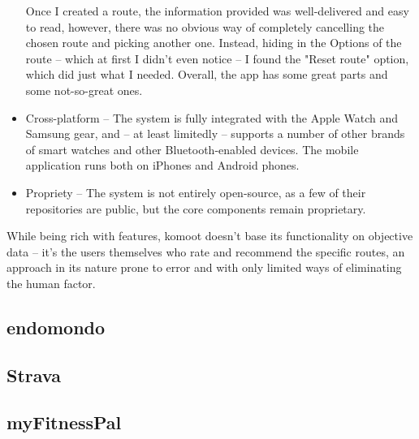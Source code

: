 \begin{itemize}
    Once I created a route, the information provided was well-delivered and easy to read, however, there was no obvious way of completely cancelling the chosen route and picking another one.
    Instead, hiding in the Options of the route -- which at first I didn't even notice -- I found the "Reset route" option, which did just what I needed.
    Overall, the app has some great parts and some not-so-great ones.
    \item Cross-platform -- The system is fully integrated with the Apple Watch and Samsung gear, and -- at least limitedly -- supports a number of other brands of smart watches and other Bluetooth-enabled devices.
    The mobile application runs both on iPhones and Android phones.
    \item Propriety -- The system is not entirely open-source, as a few of their repositories are public, but the core components remain proprietary. 
\end{itemize}

While being rich with features, komoot doesn't base its functionality on objective data -- it's the users themselves who rate and recommend the specific routes,
an approach in its nature prone to error and with only limited ways of eliminating the human factor.

\subsection{endomondo}

\subsection{Strava}

\subsection{myFitnessPal}

